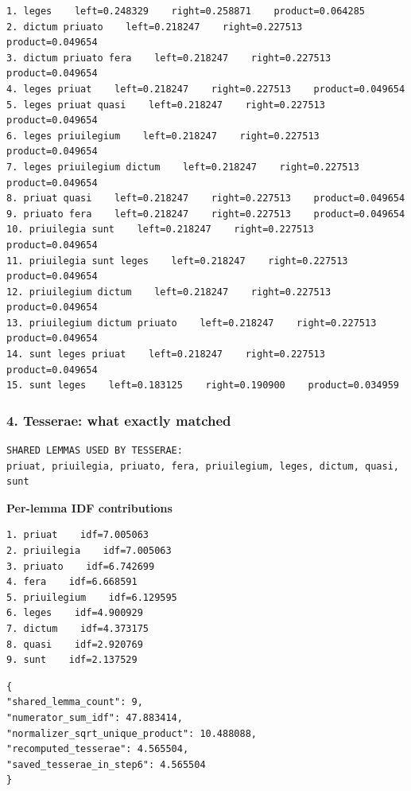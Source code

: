 \begin{lstlisting}[breaklines=true,basicstyle=\ttfamily\small]
1. leges    left=0.248329    right=0.258871    product=0.064285
2. dictum priuato    left=0.218247    right=0.227513    product=0.049654
3. dictum priuato fera    left=0.218247    right=0.227513    product=0.049654
4. leges priuat    left=0.218247    right=0.227513    product=0.049654
5. leges priuat quasi    left=0.218247    right=0.227513    product=0.049654
6. leges priuilegium    left=0.218247    right=0.227513    product=0.049654
7. leges priuilegium dictum    left=0.218247    right=0.227513    product=0.049654
8. priuat quasi    left=0.218247    right=0.227513    product=0.049654
9. priuato fera    left=0.218247    right=0.227513    product=0.049654
10. priuilegia sunt    left=0.218247    right=0.227513    product=0.049654
11. priuilegia sunt leges    left=0.218247    right=0.227513    product=0.049654
12. priuilegium dictum    left=0.218247    right=0.227513    product=0.049654
13. priuilegium dictum priuato    left=0.218247    right=0.227513    product=0.049654
14. sunt leges priuat    left=0.218247    right=0.227513    product=0.049654
15. sunt leges    left=0.183125    right=0.190900    product=0.034959
\end{lstlisting}

\subsubsection{4. Tesserae: what exactly matched}

\begin{lstlisting}[breaklines=true,basicstyle=\ttfamily\small]
SHARED LEMMAS USED BY TESSERAE:
priuat, priuilegia, priuato, fera, priuilegium, leges, dictum, quasi, sunt
\end{lstlisting}

\textbf{Per-lemma IDF contributions} 

\begin{lstlisting}[breaklines=true,basicstyle=\ttfamily\small]
1. priuat    idf=7.005063
2. priuilegia    idf=7.005063
3. priuato    idf=6.742699
4. fera    idf=6.668591
5. priuilegium    idf=6.129595
6. leges    idf=4.900929
7. dictum    idf=4.373175
8. quasi    idf=2.920769
9. sunt    idf=2.137529
\end{lstlisting}

\begin{lstlisting}[breaklines=true,basicstyle=\ttfamily\small,language={}]
{
"shared_lemma_count": 9,
"numerator_sum_idf": 47.883414,
"normalizer_sqrt_unique_product": 10.488088,
"recomputed_tesserae": 4.565504,
"saved_tesserae_in_step6": 4.565504
}
\end{lstlisting}

